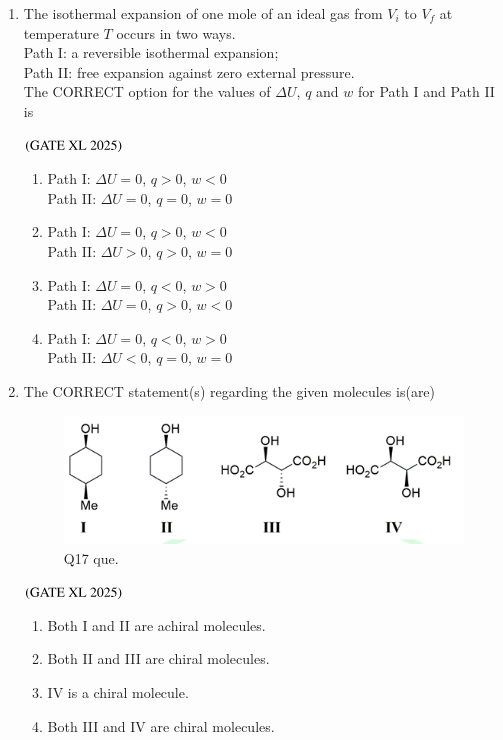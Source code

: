 \documentclass[journal]{IEEEtran}
\begin{document}
\begin{enumerate}
    \item The isothermal expansion of one mole of an ideal gas from $V_i$ to $V_f$ at temperature $T$ occurs in two ways.\\
    Path I: a reversible isothermal expansion;\\
    Path II: free expansion against zero external pressure.\\
    The CORRECT option for the values of $\Delta U$, $q$ and $w$ for Path I and Path II is

    \hfill $\left(\text{GATE XL 2025}\right)$

    \begin{enumerate}
        \item Path I: $\Delta U = 0$, $q > 0$, $w < 0$\\
              Path II: $\Delta U = 0$, $q = 0$, $w = 0$
        \item Path I: $\Delta U = 0$, $q > 0$, $w < 0$\\
              Path II: $\Delta U > 0$, $q > 0$, $w = 0$
        \item Path I: $\Delta U = 0$, $q < 0$, $w > 0$\\
              Path II: $\Delta U = 0$, $q > 0$, $w < 0$
        \item Path I: $\Delta U = 0$, $q < 0$, $w > 0$\\
              Path II: $\Delta U < 0$, $q = 0$, $w = 0$
    \end{enumerate}

    \item The CORRECT statement(s) regarding the given molecules is(are)

    \begin{figure}[H]
        \centering
        \includegraphics[width=0.8\columnwidth]{figs/xl2025_q17_que.png}
        \caption*{Q17 que.}
        \label{fig:xl2025_q17_que}
    \end{figure}

    \hfill $\left(\text{GATE XL 2025}\right)$

    \begin{enumerate}
        \item Both I and II are achiral molecules.
        \item Both II and III are chiral molecules.
        \item IV is a chiral molecule.
        \item Both III and IV are chiral molecules.
    \end{enumerate}


\end{enumerate}
\end{document}
